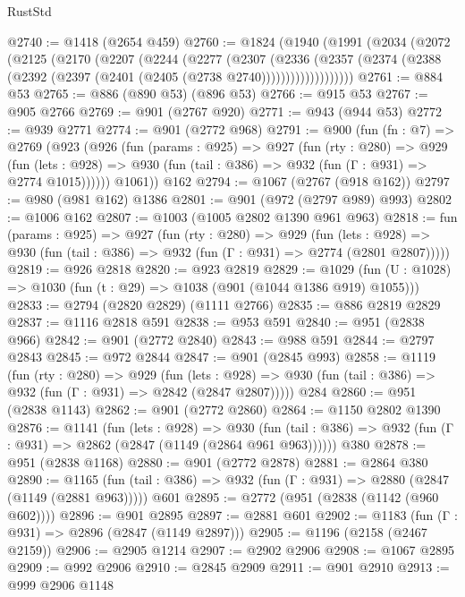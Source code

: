 \begin{lexlean}{RustStd}
\begin{coremodule}
{\begin{coremodule}
{{{{{{{{{{{{{{@2740 := @1418 (@2654 @459)
@2760 := @1824
    (@1940
      (@1991
        (@2034
          (@2072
            (@2125
              (@2170
                (@2207
                  (@2244
                    (@2277
                      (@2307
                        (@2336
                          (@2357
                            (@2374
                              (@2388 (@2392 (@2397 (@2401 (@2405 (@2738 @2740)))))))))))))))))))
@2761 := @884 @53
@2765 := @886 (@890 @53) (@896 @53)
@2766 := @915 @53
@2767 := @905 @2766
@2769 := @901 (@2767 @920)
@2771 := @943 (@944 @53)
@2772 := @939 @2771
@2774 := @901 (@2772 @968)
@2791 := @900
    (fun (fn : @7) =>
    @2769
      (@923
        (@926
          (fun (params : @925) =>
          @927
            (fun (rty : @280) =>
            @929
              (fun (lets : @928) =>
              @930 (fun (tail : @386) => @932 (fun (Γ : @931) => @2774 @1015))))))
        @1061))
    @162
@2794 := @1067 (@2767 (@918 @162))
@2797 := @980 (@981 @162) @1386
@2801 := @901 (@972 (@2797 @989) @993)
@2802 := @1006 @162
@2807 := @1003 (@1005 @2802 @1390 @961 @963)
@2818 := fun (params : @925) =>
  @927
    (fun (rty : @280) =>
    @929
      (fun (lets : @928) =>
      @930 (fun (tail : @386) => @932 (fun (Γ : @931) => @2774 (@2801 @2807)))))
@2819 := @926 @2818
@2820 := @923 @2819
@2829 := @1029 (fun (U : @1028) => @1030 (fun (t : @29) => @1038 (@901 (@1044 @1386 @919) @1055)))
@2833 := @2794 (@2820 @2829) (@1111 @2766)
@2835 := @886 @2819 @2829
@2837 := @1116 @2818 @591
@2838 := @953 @591
@2840 := @951 (@2838 @966)
@2842 := @901 (@2772 @2840)
@2843 := @988 @591
@2844 := @2797 @2843
@2845 := @972 @2844
@2847 := @901 (@2845 @993)
@2858 := @1119
    (fun (rty : @280) =>
    @929
      (fun (lets : @928) =>
      @930 (fun (tail : @386) => @932 (fun (Γ : @931) => @2842 (@2847 @2807)))))
    @284
@2860 := @951 (@2838 @1143)
@2862 := @901 (@2772 @2860)
@2864 := @1150 @2802 @1390
@2876 := @1141
    (fun (lets : @928) =>
    @930 (fun (tail : @386) => @932 (fun (Γ : @931) => @2862 (@2847 (@1149 (@2864 @961 @963))))))
    @380
@2878 := @951 (@2838 @1168)
@2880 := @901 (@2772 @2878)
@2881 := @2864 @380
@2890 := @1165
    (fun (tail : @386) => @932 (fun (Γ : @931) => @2880 (@2847 (@1149 (@2881 @963)))))
    @601
@2895 := @2772 (@951 (@2838 (@1142 (@960 @602))))
@2896 := @901 @2895
@2897 := @2881 @601
@2902 := @1183 (fun (Γ : @931) => @2896 (@2847 (@1149 @2897)))
@2905 := @1196 (@2158 (@2467 @2159))
@2906 := @2905 @1214
@2907 := @2902 @2906
@2908 := @1067 @2895
@2909 := @992 @2906
@2910 := @2845 @2909
@2911 := @901 @2910
@2913 := @999 @2906 @1148
}}}}}}}}}}}}}}
\end{coremodule}}
\end{coremodule}
\end{lexlean}
